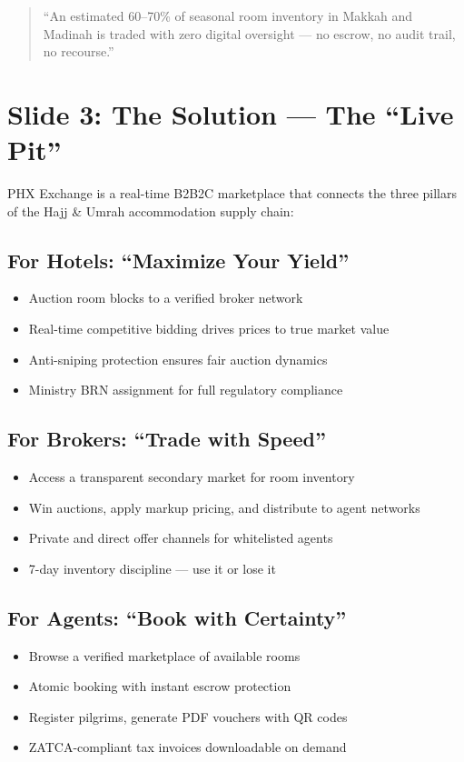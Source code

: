\documentclass[11pt,a4paper]{article}
\providecommand{\tightlist}{%
  \setlength{\itemsep}{0pt}\setlength{\parskip}{0pt}}
\begin{document}
\begin{quote}
``An estimated 60--70\% of seasonal room inventory in Makkah and Madinah is traded with zero digital oversight --- no escrow, no audit trail, no recourse.''
\end{quote}

\newpage

\section*{Slide 3: The Solution --- The ``Live Pit''}

PHX Exchange is a real-time B2B2C marketplace that connects the three pillars of the Hajj \& Umrah accommodation supply chain:

\vspace{0.5cm}

\subsection*{For Hotels: ``Maximize Your Yield''}
\begin{itemize}
\tightlist
\item Auction room blocks to a verified broker network
\item Real-time competitive bidding drives prices to true market value
\item Anti-sniping protection ensures fair auction dynamics
\item Ministry BRN assignment for full regulatory compliance
\end{itemize}

\subsection*{For Brokers: ``Trade with Speed''}
\begin{itemize}
\tightlist
\item Access a transparent secondary market for room inventory
\item Win auctions, apply markup pricing, and distribute to agent networks
\item Private and direct offer channels for whitelisted agents
\item 7-day inventory discipline --- use it or lose it
\end{itemize}

\subsection*{For Agents: ``Book with Certainty''}
\begin{itemize}
\tightlist
\item Browse a verified marketplace of available rooms
\item Atomic booking with instant escrow protection
\item Register pilgrims, generate PDF vouchers with QR codes
\item ZATCA-compliant tax invoices downloadable on demand
\end{itemize}
\end{document}
